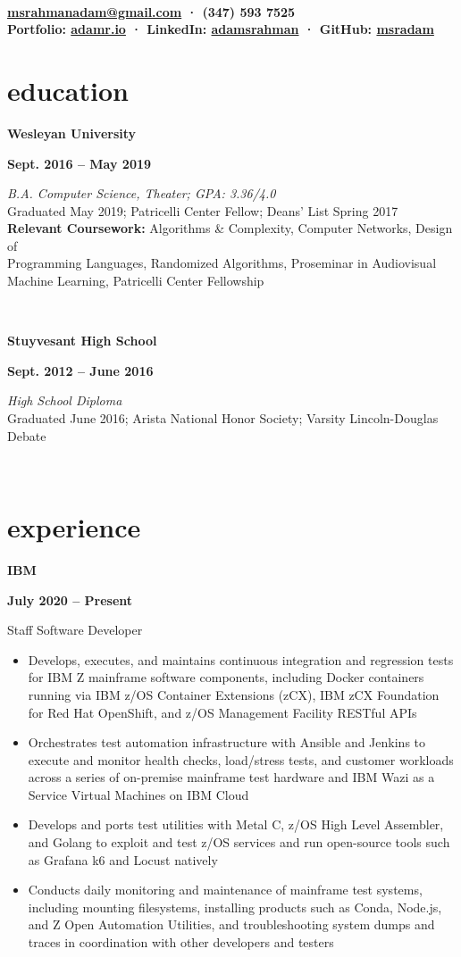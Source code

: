 \documentclass[letterpaper, 11pt]{article}
\author{Adam M. Rahman}
\makeatletter
\renewcommand{\maketitle}{
	\hspace{.125\textwidth}
	\begin{minipage}[t]{.75\textwidth}
    \begin{center}
        \fontsize{15pt}{15pt}\selectfont\bfseries \theauthor \\
        \fontsize{10pt}{15pt}\selectfont\normalfont
        \vspace{-0.5mm}
        \href{mailto:munawaradamr@gmail.com}{msrahmanadam@gmail.com} · (347) 593 7525 \\
        \vspace{-0.5mm}
        Portfolio: \href{https://adamr.io}{adamr.io} · 
        LinkedIn: \href{https://www.linkedin.com/in/adamsrahman/}{adamsrahman} · 
        GitHub: \href{https://github.com/msradam}{msradam}  \\ 
        \end{center}
    \end{minipage}}
\newcommand{\eduentry}[4]{
        \begin{minipage}[b]{0.5\textwidth}
        \raggedright
        \bf\large #2
        \end{minipage}%
        \begin{minipage}[b]{0.5\textwidth}
        \raggedleft
        \bf #1
        \end{minipage}

    \begin{minipage}[t]{.80\linewidth}
    \vspace{-3mm}
    \textit{#3} \small{#4}
    \end{minipage}\\
    \vspace{1mm}
    }
\newcommand{\expentry}[5]{

    \begin{minipage}[b]{0.5\textwidth}
        \raggedright
        \bf\large #3
        \end{minipage}%
        \begin{minipage}[b]{0.5\textwidth}
        \raggedleft
        \bf {#1} -- {#2}
        \end{minipage}

    \begin{minipage}[t]{\linewidth}
    \vspace{-3mm}
    #4
    \vspace{-1.75mm}
    \small{#5}
    \end{minipage}\\
    \vspace{1mm}
    }
\makeatother
\begin{document}
    \maketitle
    \vspace{.075cm}


    \section{education}
    \eduentry{Sept. 2016 -- May 2019}
    {Wesleyan University}
    {B.A. Computer Science, Theater; GPA: 3.36/4.0}
    {\\ Graduated May 2019; Patricelli Center Fellow; Deans' List Spring 2017\\
    \textbf{Relevant Coursework:} Algorithms \& Complexity, Computer Networks, Design of \\ Programming Languages, Randomized Algorithms, Proseminar in Audiovisual\\Machine Learning, Patricelli Center Fellowship}

    \eduentry{Sept. 2012 -- June 2016}
    {Stuyvesant High School}
    {High School Diploma}
    {\\ Graduated June 2016; Arista National Honor Society; Varsity Lincoln-Douglas Debate}

    \section{experience}
    \expentry{July 2020}
    {Present}
    {IBM}
    {Staff Software Developer}
    {
        \begin{itemize}
          \setlength\itemsep{-0.5mm}
            \item Develops, executes, and maintains continuous integration and regression tests
            for IBM Z mainframe software components, including Docker containers running via IBM z/OS Container
            Extensions (zCX), IBM zCX Foundation for Red Hat OpenShift,  and z/OS Management Facility RESTful APIs
            \item Orchestrates test automation infrastructure with Ansible and Jenkins to execute and monitor
            health checks, load/stress tests, and customer workloads across a series of on-premise mainframe test hardware and IBM Wazi as a Service Virtual Machines on IBM Cloud
            \item Develops and ports test utilities with Metal C, z/OS High Level Assembler, and Golang to exploit and test z/OS services and run open-source tools such as Grafana k6 and Locust natively
            \item Conducts daily monitoring and maintenance of mainframe test systems,
            including mounting filesystems, installing products such as Conda, Node.js,
            and Z Open Automation Utilities, and troubleshooting system dumps and traces in coordination
            with other developers and testers
        \end{itemize}
        
    }
\end{document}
